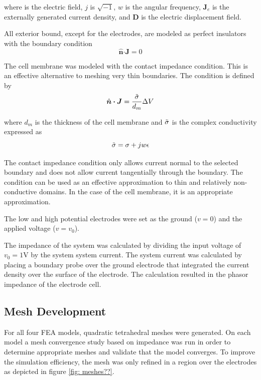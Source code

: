 where \boldsymbol\E is the electric field, $j$ is $\sqrt{-1}$, $w$ is the angular frequency, $\boldsymbol J_e$ is the externally generated current density, and $\boldsymbol D$ is the electric displacement field. 

\par All exterior bound, except for the electrodes, are modeled as perfect insulators with the boundary condition
\begin{equation}
    \hat{\boldsymbol n} \boldsymbol\cdot \boldsymbol J = 0
\end{equation}

\par The cell membrane was modeled with the contact impedance condition. This is an effective alternative to meshing very thin boundaries. The condition is defined by
\begin{equation}
    \hat{\boldsymbol n} \boldsymbol\cdot \boldsymbol J = \frac{\Tilde{\sigma}}{d_{m}} \Delta V
\end{equation}

where $d_m$ is the thickness of the cell membrane and $\Tilde{\sigma}$ is the complex conductivity expressed as
\begin{equation}
    \Tilde{\sigma} = \sigma + jw\epsilon 
\end{equation}

\par The contact impedance condition only allows current normal to the selected boundary and does not allow current tangentially through the boundary. The condition can be used as an effective approximation to thin and relatively non-conductive domains. In the case of the cell membrane, it is an appropriate approximation. 

\par The low and high potential electrodes were set as the ground ($v=0$) and the applied voltage ($v=v_0$).

\par The impedance of the system was calculated by dividing the input voltage of $v_0 = 1$V by the system system current. The system current was calculated by placing a boundary probe over the ground electrode that integrated the current density over the surface of the electrode. The calculation resulted in the phasor impedance of the electrode cell. 

\subsection{Mesh Development}
\par For all four FEA models, quadratic tetrahedral meshes were generated. On each model a mesh convergence study based on impedance was run in order to determine appropriate meshes and validate that the model converges. To improve the simulation efficiency, the mesh was only refined in a region over the electrodes as depicted in figure \ref{fig: meshes??}.

